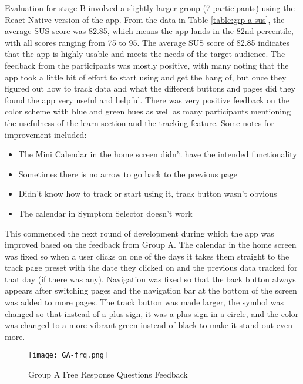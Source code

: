Evaluation for stage B involved a slightly larger group (7 participants) using the React Native version of the app. From the data in Table \ref{table:grp-a-sus}, the average SUS score was 82.85, which means the app lands in the 82nd percentile, with all scores ranging from 75 to 95. The average SUS score of 82.85 indicates that the app is highly usable and meets the needs of the target audience. The feedback from the participants was mostly positive, with many noting that the app took a little bit of effort to start using and get the hang of, but once they figured out how to track data and what the different buttons and pages did they found the app very useful and helpful. There was very positive feedback on the color scheme with blue and green hues as well as many participants mentioning the usefulness of the learn section and the tracking feature. Some notes for improvement included:
\begin{itemize}
    \item The Mini Calendar in the home screen didn't have the intended functionality
    \item Sometimes there is no arrow to go back to the previous page
    \item Didn't know how to track or start using it, track button wasn't obvious
    \item The calendar in Symptom Selector doesn't work
\end{itemize}

This commenced the next round of development during which the app was improved based on the feedback from Group A. The calendar in the home screen was fixed so when a user clicks on one of the days it takes them straight to the track page preset with the date they clicked on and the previous data tracked for that day (if there was any). Navigation was fixed so that the back button always appears after switching pages and the navigation bar at the bottom of the screen was added to more pages. The track button was made larger, the symbol was changed so that instead of a plus sign, it was a plus sign in a circle, and the color was changed to a more vibrant green instead of black to make it stand out even more.  


    \begin{figure}[h!!]
        \begin{center}
          \texttt{[image: GA-frq.png]}
          \caption{Group A Free Response Questions Feedback}
          \label{figure:ga-frq}
        \end{center}
      \end{figure}
    

